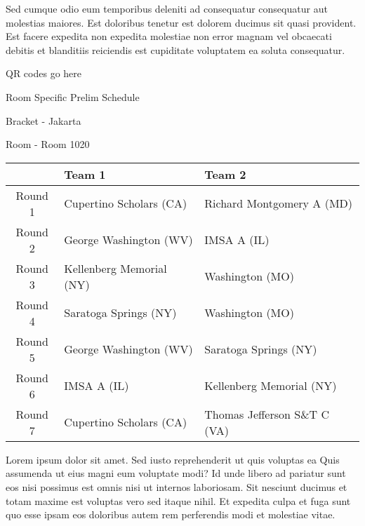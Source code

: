 \documentclass{article}%
\begin{document}
\newline%
Sed cumque odio eum temporibus deleniti ad consequatur consequatur aut molestias maiores. Est doloribus tenetur est dolorem ducimus sit quasi provident. Est facere expedita non expedita molestiae non error magnam vel obcaecati debitis et blanditiis reiciendis est cupiditate voluptatem ea soluta consequatur.%
\vspace*{140pt}%
\begin{center}%
\begin{Huge}%
QR codes go here%
\end{Huge}%
\end{center}%
\newpage%
\begin{center}%
\begin{Huge}%
Room Specific Prelim Schedule%
\end{Huge}%
\vspace*{8pt}%
\linebreak%
\begin{Large}%
Bracket {-} Jakarta%
\end{Large}%
\vspace*{8pt}%
\linebreak%
\vspace*{8pt}%
\begin{Large}%
Room {-} Room 1020%
\end{Large}%
\end{center}%
%
\begin{tabularx}{\textwidth}{|c|Y|Y|}%
\hline%
&Team 1&Team 2\\%
\hline%
Round 1&Cupertino Scholars (CA)&Richard Montgomery A (MD)\\%
Round 2&George Washington (WV)&IMSA A (IL)\\%
Round 3&Kellenberg Memorial (NY)&Washington (MO)\\%
Round 4&Saratoga Springs (NY)&Washington (MO)\\%
Round 5&George Washington (WV)&Saratoga Springs (NY)\\%
Round 6&IMSA A (IL)&Kellenberg Memorial (NY)\\%
Round 7&Cupertino Scholars (CA)&Thomas Jefferson S\&T C (VA)\\%
\hline%
\end{tabularx}%
\vspace*{8pt}%
\newline%
Lorem ipsum dolor sit amet. Sed iusto reprehenderit ut quis voluptas ea Quis assumenda ut eius magni eum voluptate modi? Id unde libero ad pariatur sunt eos nisi possimus est omnis nisi ut internos laboriosam. Sit nesciunt ducimus et totam maxime est voluptas vero sed itaque nihil. Et expedita culpa et fuga sunt quo esse ipsam eos doloribus autem rem perferendis modi et molestiae vitae.\newline%
\end{document}
